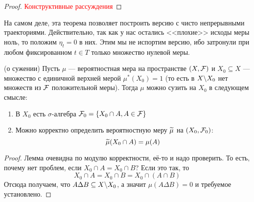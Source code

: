 \begin{proof}
	\textcolor{red}{Конструктивные рассуждения}
\end{proof}

\begin{note}
	На самом деле, эта теорема позволяет построить версию с чисто непрерывными траекториями. Действительно, так как у нас остались <<плохие>> исходы меры ноль, то положим $\eta_t = 0$ в них. Этим мы не испортим версию, ибо затронули при любом фиксированном $t \in T$ только множество нулевой меры.
\end{note}

\begin{lemma} (о сужении)
	Пусть $\mu$ --- вероятностная мера на пространстве $(X, \mathcal{F})$ и $X_0 \subseteq X$ --- множество с единичной верхней мерой $\mu^*(X_0) = 1$ (то есть в $X \backslash X_0$ нет множеств из $\mathcal{F}$ положительной меры). Тогда $\mu$ можно сузить на $X_0$ в следующем смысле:
	\begin{enumerate}
		\item В $X_0$ есть $\sigma$-алгебра $\mathcal{F}_0 = \{X_0 \cap A, A \in \mathcal{F}\}$
		
		\item Можно корректно определить вероятностную меру $\widetilde{\mu}$ на $(X_0, \mathcal{F}_0)$:
		\[
			\widetilde{\mu}(X_0 \cap A) = \mu(A)
		\]
	\end{enumerate}
\end{lemma}

\begin{proof}
	Лемма очевидна по модулю корректности, её-то и надо проверить. То есть, почему нет проблем, если $X_0 \cap A = X_0 \cap B$? Если это так, то
	\[
		X_0 \cap A = X_0 \cap B = X_0 \cap (A \cap B)
	\]
	Отсюда получаем, что $A \Delta B \subseteq X \backslash X_0$, а значит $\mu(A \Delta B) = 0$ и требуемое установлено.
\end{proof}